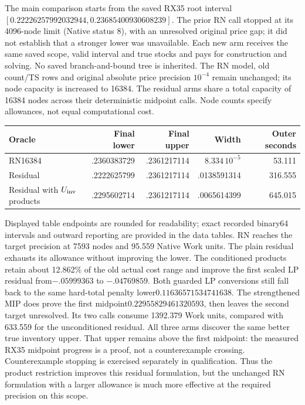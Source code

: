 The main comparison starts from the saved RX35 root interval
$[0.22226257992032944,0.23685400930608239]$. The prior RN call stopped
at its 4096-node limit (Native status 8), with an unresolved original price
gap; it did not establish that a stronger lower was unavailable. Each new
arm receives the same saved scope, valid interval and true stocks and pays
for construction and solving. No saved branch-and-bound tree is inherited.
The RN model, old count/TS rows and original absolute price precision
$10^{-4}$ remain unchanged; its node capacity is increased to 16384.
The residual arms share a total capacity of 16384 nodes across their
deterministic midpoint calls. Node counts specify allowances, not equal
computational cost.

\begin{center}
\begin{tabular}{lrrrr}
Oracle & Final lower & Final upper & Width & Outer seconds\\
\hline
RN16384 & .2360383729 & .2361217114 & $8.334\,10^{-5}$ &53.111\\
Residual & .2222625799 & .2361217114 & .0138591314 &316.555\\
Residual with $U_{\rm inv}$ products & .2295602714 & .2361217114 & .0065614399 &645.015\\
\end{tabular}
\end{center}
Displayed table endpoints are rounded for readability; exact recorded
binary64 intervals and outward reporting are provided in the data tables.
RN reaches the target precision at 7593 nodes and 95.559 Native Work units.
The plain residual exhausts its allowance without improving the lower.
The conditioned products retain about 12.862\% of the old actual cost
range and improve the first scaled LP residual from$-.05999363$ to
$-.04769859$. Both guarded LP conversions still fall back to the same
hard-total penalty lower$0.11636571534741638$. The strengthened MIP does
prove the first midpoint$0.22955829461320593$, then leaves the second
target unresolved. Its two calls consume 1392.379 Work units, compared with
633.559 for the unconditioned residual. All three arms discover the same
better true inventory upper. That upper remains above the first midpoint:
the measured RX35 midpoint progress is a proof, not a counterexample
crossing. Counterexample stopping is exercised separately in qualification.
Thus the product restriction improves this residual formulation, but
the unchanged RN formulation with a larger allowance is much more
effective at the required precision on this scope.

